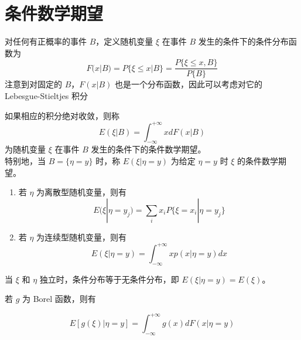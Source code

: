 \documentclass[12pt,a4paper]{amsart}
\begin{document}
\section{条件数学期望}

\begin{definition}[条件分布函数]
    对任何有正概率的事件 $B$，定义随机变量 $\xi$ 在事件 $B$ 发生的条件下的条件分布函数为
    \begin{equation}
        F(x | B) = P\{\xi \leq x | B\} = \frac{P\{\xi \leq x, B\}}{P\{B\}}
    \end{equation}
    注意到对固定的 $B$，$F(x | B)$ 也是一个分布函数，因此可以考虑对它的 Lebesgue-Stieltjes 积分
\end{definition}

\begin{definition}[条件数学期望]
    如果相应的积分绝对收敛，则称
    \begin{equation}
        E(\xi | B) = \int_{-\infty}^{+\infty} x dF(x | B)
    \end{equation}
    为随机变量 $\xi$ 在事件 $B$ 发生的条件下的条件数学期望。 \\
    特别地，当 $B = \{\eta = y\}$ 时，称 $E(\xi | \eta = y)$ 为给定 $\eta = y$ 时 $\xi$ 的条件数学期望。
\end{definition}

\begin{definition}[给定 $\eta = y$ 的条件期望]
    \begin{enumerate}
        \item 若 $\eta$ 为离散型随机变量，则有
        \begin{equation}
            E(\xi | \eta = y_j) = \sum_{i} x_i P\{\xi = x_i | \eta = y_j\}
        \end{equation}
        \item 若 $\eta$ 为连续型随机变量，则有
        \begin{equation}
            E(\xi | \eta = y) = \int_{-\infty}^{+\infty} x p(x | \eta = y) dx
        \end{equation}
    \end{enumerate}
\end{definition}

当 $\xi$ 和 $\eta$ 独立时，条件分布等于无条件分布，即 $E(\xi | \eta = y) = E(\xi)$。

若 $g$ 为 Borel 函数，则有

\begin{equation}
    E[g(\xi) | \eta = y] = \int_{-\infty}^{+\infty} g(x) dF(x | \eta = y)
\end{equation}

\appendix



{\footnotesize}
\end{document}
